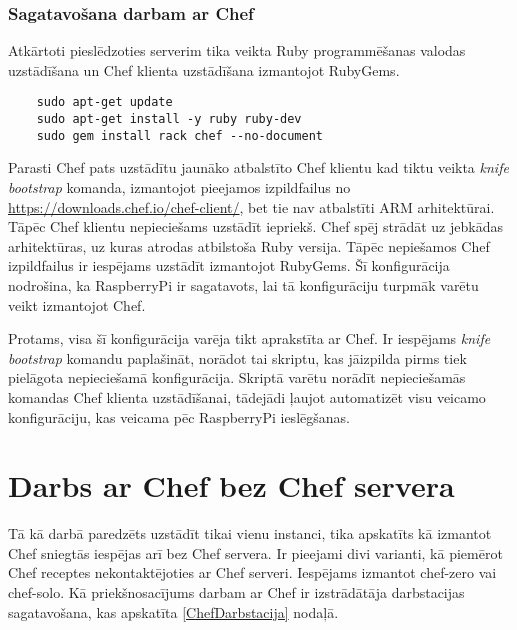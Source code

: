 \subsubsection{Sagatavošana darbam ar Chef}
Atkārtoti pieslēdzoties serverim tika veikta Ruby programmēšanas valodas uzstādīšana un Chef klienta uzstādīšana izmantojot RubyGems.
\begin{lstlisting}
	sudo apt-get update
	sudo apt-get install -y ruby ruby-dev
	sudo gem install rack chef --no-document
\end{lstlisting}
Parasti Chef pats uzstādītu jaunāko atbalstīto Chef klientu kad tiktu veikta \textit{knife bootstrap} komanda, izmantojot pieejamos izpildfailus no \url{https://downloads.chef.io/chef-client/}, bet tie nav atbalstīti ARM arhitektūrai. Tāpēc Chef klientu nepieciešams uzstādīt iepriekš. Chef spēj strādāt uz jebkādas arhitektūras, uz kuras atrodas atbilstoša Ruby versija. Tāpēc nepiešamos Chef izpildfailus ir iespējams uzstādīt izmantojot RubyGems. Šī konfigurācija nodrošina, ka RaspberryPi ir sagatavots, lai tā konfigurāciju turpmāk varētu veikt izmantojot Chef.

Protams, visa šī konfigurācija varēja tikt aprakstīta ar Chef. Ir iespējams \textit{knife bootstrap} komandu paplašināt, norādot tai skriptu, kas jāizpilda pirms tiek pielāgota nepieciešamā konfigurācija. Skriptā varētu norādīt nepieciešamās komandas Chef klienta uzstādīšanai, tādejādi ļaujot automatizēt visu veicamo konfigurāciju, kas veicama pēc RaspberryPi ieslēgšanas.


\section{Darbs ar Chef bez Chef servera}
Tā kā darbā paredzēts uzstādīt tikai vienu instanci, tika apskatīts kā izmantot Chef sniegtās iespējas arī bez Chef servera. Ir pieejami divi varianti, kā piemērot Chef receptes nekontaktējoties ar Chef serveri. Iespējams izmantot chef-zero vai chef-solo.
Kā priekšnosacījums darbam ar Chef ir izstrādātāja darbstacijas sagatavošana, kas apskatīta \ref{ChefDarbstacija} nodaļā.
